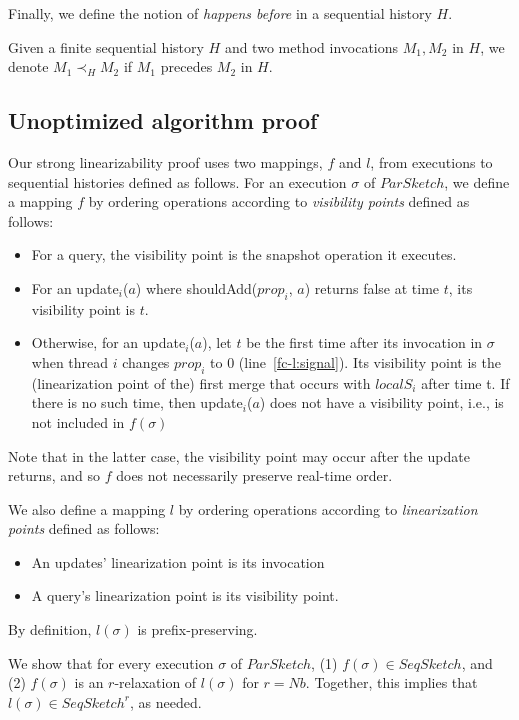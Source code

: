 Finally, we define the notion of \emph{happens before} in a sequential history $H$.
\begin{definition}
    Given a finite sequential history $H$ and two method invocations $M_1,M_2$ in $H$, we denote $M_1 \prec_H M_2$
    if $M_1$ precedes $M_2$ in $H$.
\end{definition}

\subsection{Unoptimized algorithm proof} 
\label{fc-subsec:Generic-algorithm-proof}

Our strong linearizability proof uses two mappings, $f$ and $l$, from 
executions to sequential histories defined as follows.
For an execution $\sigma$ of $ParSketch$, we define a mapping $f$ 
by ordering operations according to \emph{visibility points} defined as follows: 
\begin{itemize}
\item
For a query, the visibility point is the snapshot operation it executes.
\item 
For an update$_i$($a$) where shouldAdd($prop_i$, $a$) returns false at time $t$, its visibility point is $t$.
\item
Otherwise, for an update$_i$($a$), let $t$ be the first time after its invocation in $\sigma$
when thread $i$ changes $prop_i$ to 0 (line~\ref{fc-l:signal}).
Its visibility point is the (linearization point of the) first merge that occurs with $localS_i$ after time t.
If there is no such time, then update$_i$($a$) does not have a visibility point, i.e., is not included in $f(\sigma)$
\end{itemize}
Note that in the latter case,
the visibility point may occur after the update returns, and so $f$ does not 
necessarily preserve real-time order. 
 
We also define a mapping $l$ by ordering operations according to
\emph{linearization points} defined as follows:
\begin{itemize}
    \item
    An updates' linearization point is its invocation
    \item
    A query's linearization point is its visibility point.
\end{itemize}
By definition, $l(\sigma)$ is prefix-preserving.

We show that for every execution $\sigma$ of $ParSketch$,
(1) $f(\sigma) \in SeqSketch$, and 
(2) $f(\sigma)$ is an $r$-relaxation of $l(\sigma)$ for $r=N b$.  
Together, this implies that $l(\sigma) \in SeqSketch^r$, as needed.

